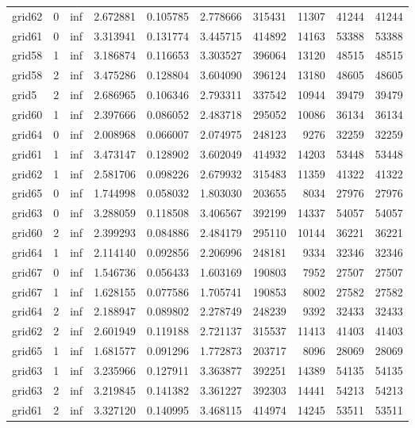 \begin{longtable}{|l|r|r|r|r|r|r|r|r|r|}
grid62 & 0 & inf & 2.672881 & 0.105785 & 2.778666 & 315431 & 11307 & 41244 & 41244 \\
grid61 & 0 & inf & 3.313941 & 0.131774 & 3.445715 & 414892 & 14163 & 53388 & 53388 \\
grid58 & 1 & inf & 3.186874 & 0.116653 & 3.303527 & 396064 & 13120 & 48515 & 48515 \\
grid58 & 2 & inf & 3.475286 & 0.128804 & 3.604090 & 396124 & 13180 & 48605 & 48605 \\
grid5 & 2 & inf & 2.686965 & 0.106346 & 2.793311 & 337542 & 10944 & 39479 & 39479 \\
grid60 & 1 & inf & 2.397666 & 0.086052 & 2.483718 & 295052 & 10086 & 36134 & 36134 \\
grid64 & 0 & inf & 2.008968 & 0.066007 & 2.074975 & 248123 & 9276 & 32259 & 32259 \\
grid61 & 1 & inf & 3.473147 & 0.128902 & 3.602049 & 414932 & 14203 & 53448 & 53448 \\
grid62 & 1 & inf & 2.581706 & 0.098226 & 2.679932 & 315483 & 11359 & 41322 & 41322 \\
grid65 & 0 & inf & 1.744998 & 0.058032 & 1.803030 & 203655 & 8034 & 27976 & 27976 \\
grid63 & 0 & inf & 3.288059 & 0.118508 & 3.406567 & 392199 & 14337 & 54057 & 54057 \\
grid60 & 2 & inf & 2.399293 & 0.084886 & 2.484179 & 295110 & 10144 & 36221 & 36221 \\
grid64 & 1 & inf & 2.114140 & 0.092856 & 2.206996 & 248181 & 9334 & 32346 & 32346 \\
grid67 & 0 & inf & 1.546736 & 0.056433 & 1.603169 & 190803 & 7952 & 27507 & 27507 \\
grid67 & 1 & inf & 1.628155 & 0.077586 & 1.705741 & 190853 & 8002 & 27582 & 27582 \\
grid64 & 2 & inf & 2.188947 & 0.089802 & 2.278749 & 248239 & 9392 & 32433 & 32433 \\
grid62 & 2 & inf & 2.601949 & 0.119188 & 2.721137 & 315537 & 11413 & 41403 & 41403 \\
grid65 & 1 & inf & 1.681577 & 0.091296 & 1.772873 & 203717 & 8096 & 28069 & 28069 \\
grid63 & 1 & inf & 3.235966 & 0.127911 & 3.363877 & 392251 & 14389 & 54135 & 54135 \\
grid63 & 2 & inf & 3.219845 & 0.141382 & 3.361227 & 392303 & 14441 & 54213 & 54213 \\
grid61 & 2 & inf & 3.327120 & 0.140995 & 3.468115 & 414974 & 14245 & 53511 & 53511 \\

\end{longtable}
